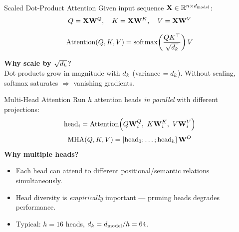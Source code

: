 \documentclass[aspectratio=169,10pt]{beamer}
\begin{document}
\begin{frame}{Scaled Dot-Product Attention}
  Given input sequence $\mathbf{X} \in \mathbb{R}^{n \times d_{\text{model}}}$:
  \[
    Q = \mathbf{X}\mathbf{W}^Q, \quad
    K   = \mathbf{X}\mathbf{W}^K, \quad
    V   = \mathbf{X}\mathbf{W}^V
  \]
  \vspace{-0.3em}
  \begin{tcolorbox}[hitbox, title=Scaled Dot-Product Attention]
    \[
      \mathrm{Attention}(Q, K, V)
      = \mathrm{softmax}\!\left(\frac{QK^{\top}}{\sqrt{d_k}}\right)V
    \]
  \end{tcolorbox}
  \vspace{0.3em}
  \textbf{Why scale by $\sqrt{d_k}$?}\\
  Dot products grow in magnitude with $d_k$ (variance $= d_k$).
  Without scaling, softmax saturates $\Rightarrow$ vanishing gradients.
\end{frame}

\begin{frame}{Multi-Head Attention}
  Run $h$ attention heads \emph{in parallel} with different projections:
  \[
    \text{head}_i = \Attn\!\left(\query\mat{W}_i^Q,\ \key\mat{W}_i^K,\ \val\mat{W}_i^V\right)
  \]
  \[
    \mathrm{MHA}(Q,K,V) = \left[\text{head}_1;\ldots;\text{head}_h\right]\mathbf{W}^O
  \]
  \vspace{0.4em}
  \textbf{Why multiple heads?}
  \begin{itemize}
    \item Each head can attend to different positional/semantic relations simultaneously.
    \item Head diversity is \emph{empirically} important — pruning heads degrades performance.
    \item Typical: $h = 16$ heads, $d_k = d_{\text{model}} / h = 64$.
  \end{itemize}
\end{frame}
\end{document}
